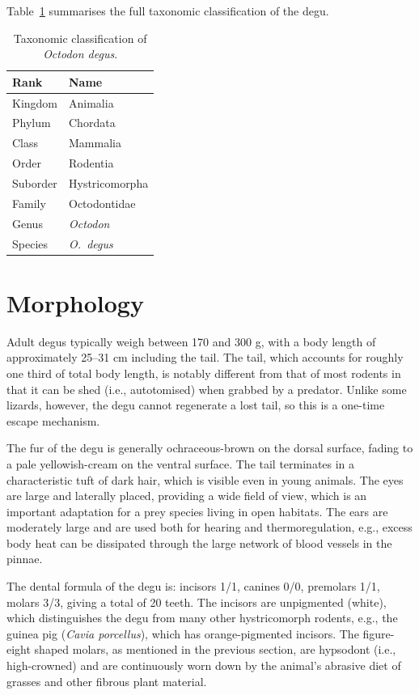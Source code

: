 \documentclass[12pt,a4paper]{article}
\begin{document}
Table~\ref{tab:taxonomy} summarises the full taxonomic classification of the degu.

\begin{table}[ht]
\centering
\caption{Taxonomic classification of \textit{Octodon degus}.}
\label{tab:taxonomy}
\begin{tabular}{ll}
\toprule
\textbf{Rank} & \textbf{Name} \\
\midrule
Kingdom  & Animalia \\
Phylum   & Chordata \\
Class    & Mammalia \\
Order    & Rodentia \\
Suborder & Hystricomorpha \\
Family   & Octodontidae \\
Genus    & \textit{Octodon} \\
Species  & \textit{O.\ degus} \\
\bottomrule
\end{tabular}
\end{table}

\section{Morphology}

Adult degus typically weigh between 170 and 300 g, with a body length of approximately 25--31 cm including the tail.
The tail, which accounts for roughly one third of total body length, is notably different from that of most rodents in that it can be shed (i.e., autotomised) when grabbed by a predator.
Unlike some lizards, however, the degu cannot regenerate a lost tail, so this is a one-time escape mechanism.

The fur of the degu is generally ochraceous-brown on the dorsal surface, fading to a pale yellowish-cream on the ventral surface.
The tail terminates in a characteristic tuft of dark hair, which is visible even in young animals.
The eyes are large and laterally placed, providing a wide field of view, which is an important adaptation for a prey species living in open habitats.
The ears are moderately large and are used both for hearing and thermoregulation, e.g., excess body heat can be dissipated through the large network of blood vessels in the pinnae.

The dental formula of the degu is: incisors 1/1, canines 0/0, premolars 1/1, molars 3/3, giving a total of 20 teeth.
The incisors are unpigmented (white), which distinguishes the degu from many other hystricomorph rodents, e.g., the guinea pig (\textit{Cavia porcellus}), which has orange-pigmented incisors.
The figure-eight shaped molars, as mentioned in the previous section, are hypsodont (i.e., high-crowned) and are continuously worn down by the animal's abrasive diet of grasses and other fibrous plant material.
\end{document}
